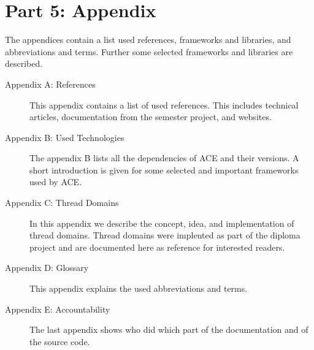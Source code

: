  
\section*{Part 5: Appendix}
The appendices contain a list used references, frameworks and libraries, 
and abbreviations and terms. Further some selected frameworks and libraries
are described.

\begin{description}
 \item[Appendix A: References] This appendix contains a list of used references. This includes technical articles, documentation from the semester project, and websites.
 \item[Appendix B: Used Technologies] The appendix B lists all the dependencies of ACE and their versions. A short introduction is given for some selected and important frameworks used by ACE.
 \item[Appendix C: Thread Domains] In this appendix we describe the concept, idea, and implementation of thread domains. Thread domains were implented as part of the diploma project and are documented here as reference for interested readers.
 \item[Appendix D: Glossary] This appendix explains the used abbreviations and terms.
 \item[Appendix E: Accountability] The last appendix shows who did which part of the documentation and of the source code.
\end{description}
